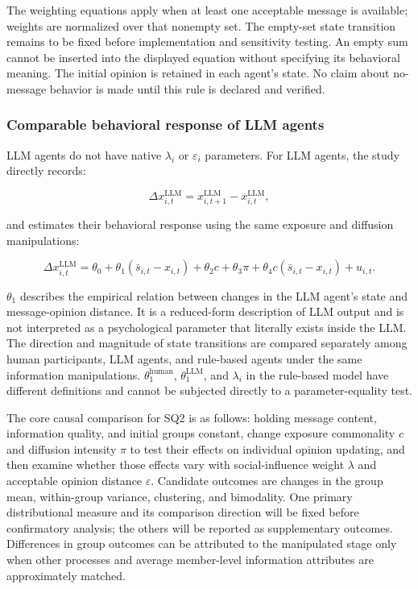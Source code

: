 \documentclass[11pt,a4paper]{article}
\begin{document}
The weighting equations apply when at least one acceptable message is available; weights are normalized over that nonempty set. The empty-set state transition remains to be fixed before implementation and sensitivity testing. An empty sum cannot be inserted into the displayed equation without specifying its behavioral meaning. The initial opinion is retained in each agent's state. No claim about no-message behavior is made until this rule is declared and verified.

\subsubsection{Comparable behavioral response of LLM agents}

LLM agents do not have native $\lambda_i$ or $\varepsilon_i$ parameters. For LLM agents, the study directly records:

\begin{equation*}
\Delta x^{\text{LLM}}_{i,t}
=
x^{\text{LLM}}_{i,t+1}
-
x^{\text{LLM}}_{i,t},
\end{equation*}

and estimates their behavioral response using the same exposure and diffusion manipulations:

\begin{equation*}
\Delta x^{\text{LLM}}_{i,t}
=
\theta_0
+
\theta_1(\bar s_{i,t}-x_{i,t})
+
\theta_2c
+
\theta_3\pi
+
\theta_4c(\bar s_{i,t}-x_{i,t})
+
u_{i,t}.
\end{equation*}

$\theta_1$ describes the empirical relation between changes in the LLM agent's state and message-opinion distance. It is a reduced-form description of LLM output and is not interpreted as a psychological parameter that literally exists inside the LLM. The direction and magnitude of state transitions are compared separately among human participants, LLM agents, and rule-based agents under the same information manipulations. $\theta_1^{\text{human}}$, $\theta_1^{\text{LLM}}$, and $\lambda_i$ in the rule-based model have different definitions and cannot be subjected directly to a parameter-equality test.

The core causal comparison for SQ2 is as follows: holding message content, information quality, and initial groups constant, change exposure commonality $c$ and diffusion intensity $\pi$ to test their effects on individual opinion updating, and then examine whether those effects vary with social-influence weight $\lambda$ and acceptable opinion distance $\varepsilon$. Candidate outcomes are changes in the group mean, within-group variance, clustering, and bimodality. One primary distributional measure and its comparison direction will be fixed before confirmatory analysis; the others will be reported as supplementary outcomes. Differences in group outcomes can be attributed to the manipulated stage only when other processes and average member-level information attributes are approximately matched.
\end{document}

